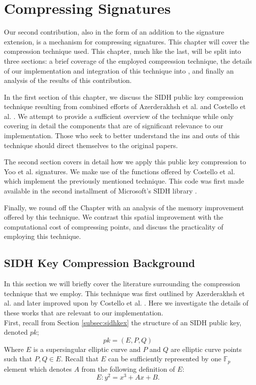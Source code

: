 \chapter{Compressing Signatures}
\label{ch:compress}

Our second contribution, also in the form of an addition to the \sidh signature extension, is a mechanism for compressing signatures. This chapter will cover the compression technique used. This chapter, much like the last, will be split into three sections: a brief coverage of the employed compression technique, the details of our implementation and integration of this technique into \sidh, and finally an analysis of the results of this contribution.

In the first section of this chapter, we discuss the SIDH public key compression technique resulting from combined efforts of Azerderakhsh et al. \cite{compwr} and Costello et al. \cite{pkcomp}. We attempt to provide a sufficient overview of the technique while only covering in detail the components that are of significant relevance to our implementation. Those who seek to better understand the ins and outs of this technique should direct themselves to the original papers.  

The second section covers in detail how we apply this public key compression to Yoo et al. signatures. We make use of the functions offered by Costello et al. which implement the previously mentioned technique. This code was first made available in the second installment of Microsoft's SIDH library \cite{sidhcode}.

Finally, we round off the Chapter with an analysis of the memory improvement offered by this technique. We contrast this spatial improvement with the computational cost of compressing points, and discuss the practicality of employing this technique. 

\section{SIDH Key Compression Background}

In this section we will briefly cover the literature surrounding the compression technique that we employ. This technique was first outlined by Azerderakhsh et al. \cite{compwr} and later improved upon by Costello et al. \cite{pkcomp}. Here we investigate the details of these works that are relevant to our implementation.\\

\noindent
First, recall from Section \ref{subsec:sidhkex} the structure of an SIDH public key, denoted $pk$;
$$
pk = (E, P, Q)
$$
Where $E$ is a supersingular elliptic curve and $P$ and $Q$ are elliptic curve points such that $P, Q \in E$. Recall that $E$ can be sufficiently represented by one $\mathbb{F}_{p}$ element which denotes $A$ from the following definition of $E$:
$$
E : y^2 = x^3 + Ax + B.
$$

